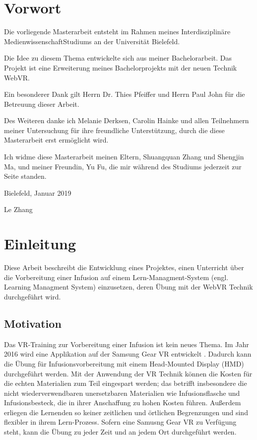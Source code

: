 \chapter*{Vorwort}

Die vorliegende Masterarbeit entsteht im Rahmen meines \glqq Interdisziplinäre Medienwissenschaft\grqq\-Studiums an der Universität Bielefeld.
 
Die Idee zu diesem Thema entwickelte sich aus meiner Bachelorarbeit. Das Projekt ist eine Erweiterung meines Bachelorprojekts mit der neuen Technik WebVR.
 
Ein besonderer Dank gilt Herrn Dr. Thies Pfeiffer und Herrn Paul John für die Betreuung dieser Arbeit.
 
Des Weiteren danke ich Melanie Derksen, Carolin Hainke und allen Teilnehmern meiner Untersuchung für ihre freundliche Unterstützung, durch die diese Masterarbeit erst ermöglicht wird.
 
Ich widme diese Masterarbeit meinen Eltern, Shuangquan Zhang und Shengjin Ma, und meiner Freundin, Yu Fu, die mir während des Studiums jederzeit zur Seite standen.

\vspace{5mm}
 
Bielefeld, Januar 2019
 
Le Zhang

\chapter{Einleitung}

Diese Arbeit beschreibt die Entwicklung eines Projektes, einen Unterricht über die Vorbereitung einer Infusion auf einem Lern-Managment-System (engl. Learning Managment System) einzusetzen, deren Übung mit der WebVR Technik durchgeführt wird.

\section{Motivation}

Das VR-Training zur Vorbereitung einer Infusion ist kein neues Thema. Im Jahr 2016 wird eine Applikation auf der Samsung Gear VR entwickelt \citep{26}. Dadurch kann die Übung für Infusionsvorbereitung mit einem Head-Mounted Display (HMD) durchgeführt werden. Mit der Anwendung der VR Technik können die Kosten für die echten Materialien zum Teil eingespart werden; das betrifft insbesondere die nicht wiederverwendbaren unersetzbaren Materialien wie Infusionsflasche und Infusionsbesteck, die in ihrer Anschaffung zu hohen Kosten führen. Außerdem erliegen die Lernenden so keiner zeitlichen und örtlichen Begrenzungen und sind flexibler in ihrem Lern-Prozess. Sofern eine Samusng Gear VR zu Verfügung steht, kann die Übung zu jeder Zeit und an jedem Ort durchgeführt werden.

